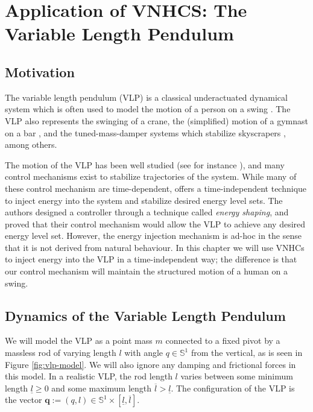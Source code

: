 
\chapter{Application of VNHCS: The Variable Length Pendulum}\label{sec:vlp}
\section{Motivation}
The variable length pendulum (VLP) is a classical underactuated dynamical system
which is often used to model the motion of a person on a swing
\cite{pumping_swing_standing_squatting,how_to_pump_a_swing}.
The VLP also represents the swinging of a crane, the (simplified) motion of a
gymnast on a bar \cite{pendulum_length_giant_gymnastics}, and the
tuned-mass-damper systems which stabilize skyscrapers
\cite{vlp_tuned_mass_damper}, among others.

The motion of the VLP has been well studied (see for instance
\cite{dynamics_periodic_vlp}), and many control mechanisms exist
to stabilize trajectories of the system. While many of these control mechanism
are time-dependent, \cite{vlp_energy_shaping}
offers a time-independent technique to inject energy into the system and
stabilize desired energy level sets. The authors designed a controller through a
technique called \textit{energy shaping}, and proved that their control
mechanism would allow the VLP to achieve any desired energy level set.
However, the energy injection mechanism is
ad-hoc in the sense that it is not derived from natural behaviour. In
this chapter we will use VNHCs to inject energy into the VLP in a
time-independent way;
the difference is that our control mechanism will maintain the structured motion
of a human on a swing.

\section{Dynamics of the Variable Length Pendulum}
We will model the VLP as a point mass \(m\)
connected to a fixed pivot by a massless rod of varying length \(l\) with angle 
\(q \in \mathbb{S}^1\) from the vertical, as is seen in Figure
\ref{fig:vlp-model}. 
We will also ignore any damping and frictional forces in this model.
In a realistic VLP, the rod length \(l\) varies between some minimum
length \(\underline{l} \geq 0\) and some maximum length 
\(\overline{l} > \underline{l}\). The configuration of the VLP is the vector
\(\mathbf{q} := (q,l) \in \mathbb{S}^1 \times [\underline{l},\overline{l}]\).

